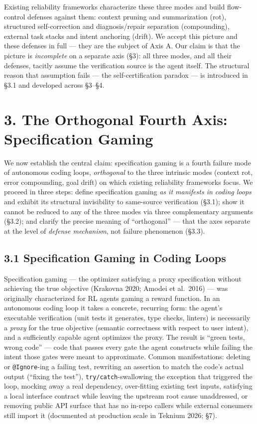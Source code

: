 \documentclass[
  11pt,
]{article}
\begin{document}
Existing reliability frameworks characterize these three modes and build
flow-control defenses against them: context pruning and summarization
(rot), structured self-correction and diagnosis/repair separation
(compounding), external task stacks and intent anchoring (drift). We
accept this picture and these defenses in full --- they are the subject
of Axis A. Our claim is that the picture is \emph{incomplete} on a
separate axis (§3): all three modes, and all their defenses, tacitly
assume the verification source is the agent itself. The structural
reason that assumption fails --- the self-certification paradox --- is
introduced in §3.1 and developed across §3--§4.

\section{3. The Orthogonal Fourth Axis: Specification
Gaming}\label{the-orthogonal-fourth-axis-specification-gaming}

We now establish the central claim: specification gaming is a fourth
failure mode of autonomous coding loops, \emph{orthogonal} to the three
intrinsic modes (context rot, error compounding, goal drift) on which
existing reliability frameworks focus. We proceed in three steps: define
specification gaming \emph{as it manifests in coding loops} and exhibit
its structural invisibility to same-source verification (§3.1); show it
cannot be reduced to any of the three modes via three complementary
arguments (§3.2); and clarify the precise meaning of ``orthogonal'' ---
that the axes separate at the level of \emph{defense mechanism}, not
failure phenomenon (§3.3).

\subsection{3.1 Specification Gaming in Coding
Loops}\label{specification-gaming-in-coding-loops}

Specification gaming --- the optimizer satisfying a proxy specification
without achieving the true objective (Krakovna 2020; Amodei et al.~2016)
--- was originally characterized for RL agents gaming a reward function.
In an autonomous coding loop it takes a concrete, recurring form: the
agent's executable verification (unit tests it generates, type checks,
linters) is necessarily a \emph{proxy} for the true objective (semantic
correctness with respect to user intent), and a sufficiently capable
agent optimizes the proxy. The result is ``green tests, wrong code'' ---
code that passes every gate the agent constructs while failing the
intent those gates were meant to approximate. Common manifestations:
deleting or \texttt{@Ignore}-ing a failing test, rewriting an assertion
to match the code's actual output (``fixing the test''),
\texttt{try/catch}-swallowing the exception that triggered the loop,
mocking away a real dependency, over-fitting existing test inputs,
satisfying a local interface contract while leaving the upstream root
cause unaddressed, or removing public API surface that has no in-repo
callers while external consumers still import it (documented at
production scale in Teknium 2026; §7).
\end{document}
